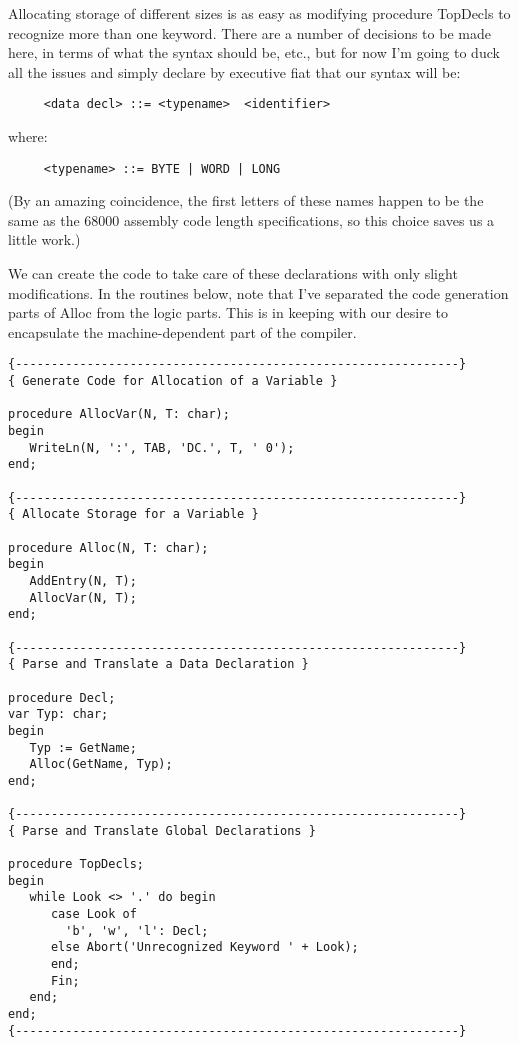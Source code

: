 Allocating storage of different sizes  is  as  easy  as modifying procedure TopDecls to recognize more than one keyword. There are a  number  of  decisions to be made here, in terms  of  what  the syntax should be, etc., but for now I'm  going  to  duck  all the issues and simply declare by  executive fiat that our syntax will be:

\begin{verbatim}
     <data decl> ::= <typename>  <identifier>
\end{verbatim}

where:

\begin{verbatim}
     <typename> ::= BYTE | WORD | LONG
\end{verbatim}

(By  an amazing coincidence, the first  letters  of  these  names happen  to  be  the  same  as  the  68000  assembly  code  length specifications, so this choice saves us a little work.)

We can create the code to take care of  these  declarations  with only slight modifications. In the routines below, note that I've separated  the  code  generation parts of Alloc  from  the  logic parts. This  is  in  keeping  with our desire to encapsulate the machine-dependent part of the compiler.

\begin{verbatim}
{--------------------------------------------------------------}
{ Generate Code for Allocation of a Variable }

procedure AllocVar(N, T: char);
begin
   WriteLn(N, ':', TAB, 'DC.', T, ' 0');
end;

{--------------------------------------------------------------}
{ Allocate Storage for a Variable }

procedure Alloc(N, T: char);
begin
   AddEntry(N, T);
   AllocVar(N, T);
end;

{--------------------------------------------------------------}
{ Parse and Translate a Data Declaration }

procedure Decl;
var Typ: char;
begin
   Typ := GetName;
   Alloc(GetName, Typ);
end;

{--------------------------------------------------------------}
{ Parse and Translate Global Declarations }

procedure TopDecls;
begin
   while Look <> '.' do begin
      case Look of
        'b', 'w', 'l': Decl;
      else Abort('Unrecognized Keyword ' + Look);
      end;
      Fin;
   end;
end;
{--------------------------------------------------------------}
\end{verbatim}

